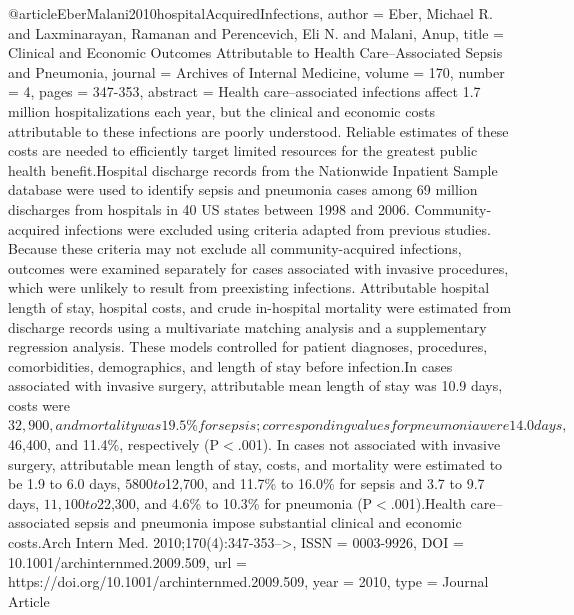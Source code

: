 @article{EberMalani2010hospitalAcquiredInfections,
   author = {Eber, Michael R. and Laxminarayan, Ramanan and Perencevich, Eli N. and Malani, Anup},
   title = {Clinical and Economic Outcomes Attributable to Health Care–Associated Sepsis and Pneumonia},
   journal = {Archives of Internal Medicine},
   volume = {170},
   number = {4},
   pages = {347-353},
   abstract = {Health care–associated infections affect 1.7 million hospitalizations each year, but the clinical and economic costs attributable to these infections are poorly understood. Reliable estimates of these costs are needed to efficiently target limited resources for the greatest public health benefit.Hospital discharge records from the Nationwide Inpatient Sample database were used to identify sepsis and pneumonia cases among 69 million discharges from hospitals in 40 US states between 1998 and 2006. Community-acquired infections were excluded using criteria adapted from previous studies. Because these criteria may not exclude all community-acquired infections, outcomes were examined separately for cases associated with invasive procedures, which were unlikely to result from preexisting infections. Attributable hospital length of stay, hospital costs, and crude in-hospital mortality were estimated from discharge records using a multivariate matching analysis and a supplementary regression analysis. These models controlled for patient diagnoses, procedures, comorbidities, demographics, and length of stay before infection.In cases associated with invasive surgery, attributable mean length of stay was 10.9 days, costs were $32,900, and mortality was 19.5\% for sepsis; corresponding values for pneumonia were 14.0 days, $46,400, and 11.4\%, respectively (P$<$.001). In cases not associated with invasive surgery, attributable mean length of stay, costs, and mortality were estimated to be 1.9 to 6.0 days, $5800 to $12,700, and 11.7\% to 16.0\% for sepsis and 3.7 to 9.7 days, $11,100 to $22,300, and 4.6\% to 10.3\% for pneumonia (P$<$.001).Health care–associated sepsis and pneumonia impose substantial clinical and economic costs.Arch Intern Med. 2010;170(4):347-353-->},
   ISSN = {0003-9926},
   DOI = {10.1001/archinternmed.2009.509},
   url = {https://doi.org/10.1001/archinternmed.2009.509},
   year = {2010},
   type = {Journal Article}
}


